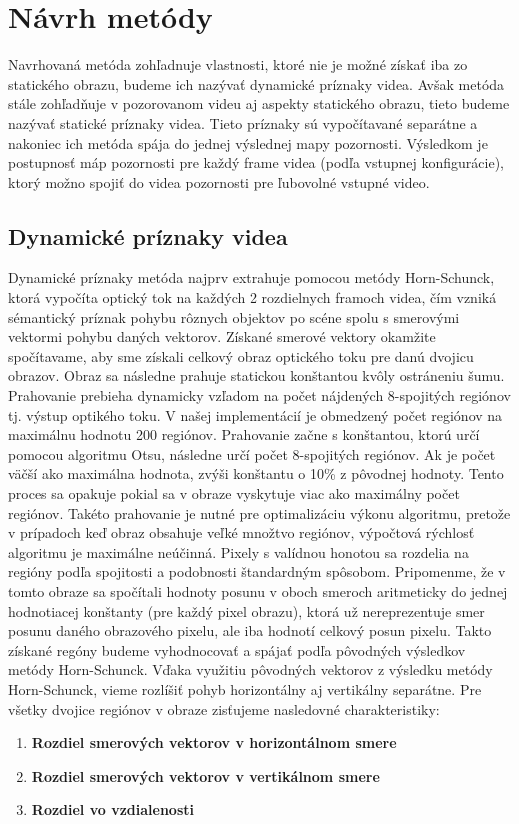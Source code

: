 \section{Návrh metódy}
Navrhovaná metóda zohľadnuje vlastnosti, ktoré nie je možné získať iba zo statického obrazu, budeme ich nazývať dynamické príznaky videa.
Avšak metóda stále zohľadňuje v pozorovanom videu aj aspekty statického obrazu, tieto budeme nazývať statické príznaky videa.
Tieto príznaky sú vypočítavané separátne a nakoniec ich metóda spája do jednej výslednej mapy pozornosti. Výsledkom je postupnosť máp pozornosti pre každý frame videa (podľa vstupnej konfigurácie), ktorý možno spojiť do videa pozornosti pre ľubovolné vstupné video.

\subsection{Dynamické príznaky videa}
Dynamické príznaky metóda najprv extrahuje pomocou metódy Horn-Schunck\cite{horn-struct2}, ktorá vypočíta optický tok na každých 2 rozdielnych framoch videa, čím vzniká sémantický príznak pohybu rôznych objektov po scéne spolu s smerovými vektormi pohybu daných vektorov.
Získané smerové vektory okamžite spočítavame, aby sme získali celkový obraz optického toku pre danú dvojicu obrazov.
Obraz sa následne prahuje statickou konštantou kvôly ostráneniu šumu.
Prahovanie prebieha dynamicky vzľadom na počet nájdených 8-spojitých regiónov tj. výstup optikého toku. V našej implementácií je obmedzený počet regiónov na maximálnu hodnotu 200 regiónov.
Prahovanie začne s konštantou, ktorú určí pomocou algoritmu Otsu\cite{otsu}, následne určí počet 8-spojitých regiónov. Ak je počet väčší ako maximálna hodnota, zvýši konštantu o 10\% z pôvodnej hodnoty.
Tento proces sa opakuje pokial sa v obraze vyskytuje viac ako maximálny počet regiónov.
Takéto prahovanie je nutné pre optimalizáciu výkonu algoritmu, pretože v prípadoch keď obraz obsahuje veľké množtvo regiónov, výpočtová rýchlosť algoritmu je maximálne neúčinná.
Pixely s valídnou honotou sa rozdelia na regióny podľa spojitosti a podobnosti štandardným spôsobom.
Pripomenme, že v tomto obraze sa spočítali hodnoty posunu v oboch smeroch aritmeticky do jednej hodnotiacej konštanty (pre každý pixel obrazu), ktorá už nereprezentuje smer posunu daného obrazového pixelu, ale iba hodnotí celkový posun pixelu.
Takto získané regóny budeme vyhodnocovať a spájať podľa pôvodných výsledkov metódy Horn-Schunck.
Vďaka využitiu pôvodných vektorov z výsledku metódy Horn-Schunck, vieme rozlíšiť pohyb horizontálny aj vertikálny separátne.
Pre všetky dvojice regiónov v obraze zisťujeme nasledovné charakteristiky:
\begin{enumerate}
  \item\textbf{Rozdiel smerových vektorov v horizontálnom smere}
  \item\textbf{Rozdiel smerových vektorov v vertikálnom smere}
  \item\textbf{Rozdiel vo vzdialenosti}
\end{enumerate}
